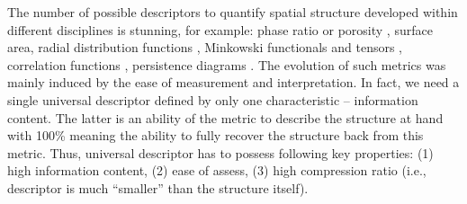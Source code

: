 \documentclass[reprint,amsmath,amssymb,aps,pre,showkeys,showpacs]{revtex4-1}
\begin{document}
The number of possible descriptors to quantify spatial structure developed
within different disciplines is stunning, for example: phase ratio or porosity
\cite{anovitz2015characterization}, surface area, radial distribution functions
\cite{zimm1948scattering,becker2010radial}, Minkowski functionals
\cite{vogel2010} and tensors \cite{schroder2011minkowski}, correlation functions
\cite{Torquato_book}, persistence diagrams
\cite{shivashankar2015felix,saadatfar2017pore,obayashi2018persistence,zubov2024search}. The
evolution of such metrics was mainly induced by the ease of measurement and
interpretation. In fact, we need a single universal descriptor defined by only
one characteristic -- information content. The latter is an ability of the
metric to describe the structure at hand with 100\% meaning the ability to
fully recover the structure back from this metric. Thus, universal descriptor
has to possess following key properties: (1) high information content, (2) ease
of assess, (3) high compression ratio (i.e., descriptor is much ``smaller'' than
the structure itself).
\end{document}

